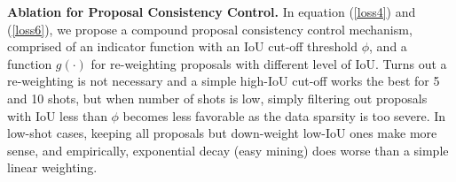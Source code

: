 \documentclass[final]{cvpr}
\begin{document}
\textbf{Ablation for Proposal Consistency Control.}
In equation (\ref{loss4}) and (\ref{loss6}), we propose a compound proposal consistency control mechanism, comprised of an indicator function with an IoU cut-off threshold $\phi$, and a function $g(\cdot)$ for re-weighting proposals with different level of IoU. Turns out a re-weighting is not necessary and a simple high-IoU cut-off works the best for 5 and 10 shots, but when number of shots is low, simply filtering out proposals with IoU less than $\phi$ becomes less favorable as the data sparsity is too severe. In low-shot cases, keeping all proposals but down-weight low-IoU ones make more sense, and empirically, exponential decay (easy mining) does worse than a simple linear weighting.

\begin{table}[h]\normalsize
\label{ab-loss}
\begin{center}
\end{center}
\vspace{-1.5mm}
\caption{Ablation for proposal consistency control in FSCE.}
\end{table}
\end{document}
